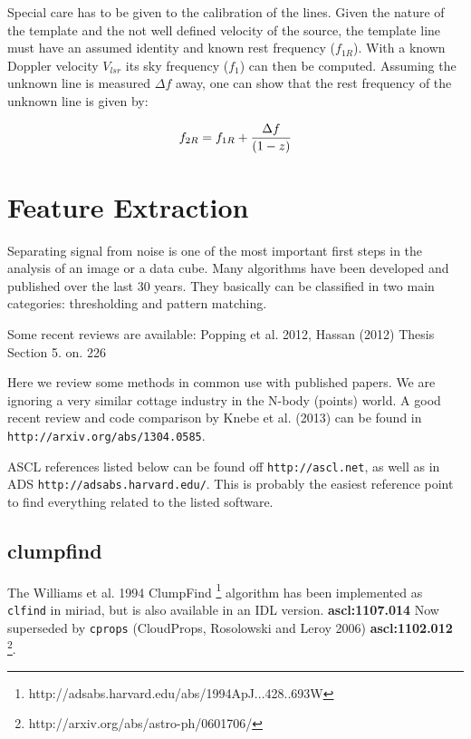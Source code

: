 \documentclass[preprint]{aastex} %
\begin{document}
Special care has to be given to the calibration of the lines. Given the nature of
the template and the not well defined velocity of the source, the template line
must have an assumed identity and known rest frequency  ($f_{1R}$). 
With a known Doppler velocity $V_{lsr}$ its sky frequency ($f_1$) 
can then be computed.  Assuming the unknown line is measured ${\Delta f}$ away, one
can show that the rest frequency of the unknown line is given by:


$$
 f_{2R} = f_{1R} + {  {\Delta f} \over { (1-z) }}
$$

\section{Feature Extraction}
\label{s:feature}

Separating signal from noise is one of the most important first steps
in the analysis of an image or a data cube. Many algorithms have
been developed and published over the last 30 years. They basically
can be classified in two main  categories:  thresholding and pattern
matching.

Some recent reviews are available:
Popping et al. 2012,  Hassan (2012) Thesis Section 5.   
on. 
 226


Here we review some methods in common use with published papers. 
We are ignoring a very similar cottage industry in the N-body (points)
world. A good recent review and code comparison 
by Knebe et al. (2013) can be found
in {\tt http://arxiv.org/abs/1304.0585}.

ASCL references listed below can be found off {\tt http://ascl.net}, as well
as in ADS {\tt http://adsabs.harvard.edu/}. This is probably the easiest
reference point to find everything related to the listed software.

\subsection{clumpfind}

The Williams et al. 1994 
ClumpFind
\footnote{http://adsabs.harvard.edu/abs/1994ApJ...428..693W}
algorithm has been implemented as {\tt clfind}
in miriad, but is also available in an IDL version. 
{\bf ascl:1107.014}
Now superseded
by {\tt cprops} (CloudProps, Rosolowski and Leroy 2006) {\bf ascl:1102.012}
\footnote{http://arxiv.org/abs/astro-ph/0601706/}.
\end{document}
